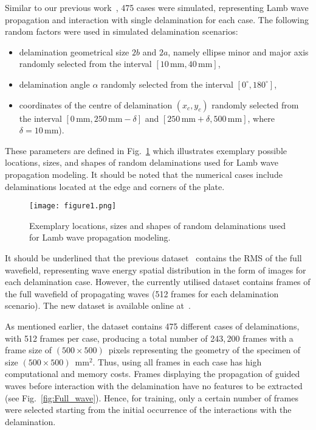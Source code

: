 \begin{sloppypar}
	Similar to our previous work~\cite{Ijjeh2021, Ijjeh2022}, 475 cases were simulated, representing Lamb wave propagation and interaction with single delamination for each case. 
	The following random factors were used in simulated delamination scenarios:
	\begin{itemize}
		\item delamination geometrical size	\(2b\) and \(2a\), namely ellipse minor and major axis randomly selected from the interval \(\left[10 \, \textrm{mm}, 40\, \textrm{mm}\right]\),
		\item delamination angle \(\alpha\) randomly selected from the interval \( \left[ 0^{\circ}, 180^{\circ} \right]\),
		\item coordinates of the centre of delamination \((x_c,y_c)\) randomly selected from the interval \(\left[0\, \textrm{mm}, 250\, \textrm{mm} -\delta \right]\) and \( \left[250\, \textrm{mm}+\delta, 500\, \textrm{mm} \right] \), where \(\delta = 10\, \textrm{mm}\)).
	\end{itemize}
	These parameters are defined in Fig.~\ref{fig:random_delaminations} which illustrates exemplary possible locations, sizes, and shapes of random delaminations used for Lamb wave propagation modeling.
	It should be noted that the numerical cases include delaminations located at the edge and corners of the plate.
	\begin{figure}[!ht]
		\centering
		\texttt{[image: figure1.png]}
		\caption{Exemplary locations, sizes and shapes of random delaminations used for Lamb wave propagation modeling.}
		\label{fig:random_delaminations}
	\end{figure}
	
	It should be underlined that the previous dataset~\cite{Kudela2020d} contains the RMS of the full wavefield, representing wave energy spatial distribution in the form of images for each delamination case.
	However, the currently utilised dataset contains frames of the full wavefield of propagating waves (512 frames for each delamination scenario).
	The new dataset is available online at~\cite{kudela_pawel_2021_5414555}.
	
	As mentioned earlier, the dataset contains 475 different cases of delaminations, with 512 frames per case, producing a total number of 243,\,200 frames with a frame size of \((500\times500)\)~pixels representing the geometry of the specimen of size \((500\times500)\)~mm\(^{2}\).
	Thus, using all frames in each case has high computational and memory costs.
	Frames displaying the propagation of guided waves before interaction with the delamination have no features to be extracted (see Fig.~\ref{fig:Full_wave}).
	Hence, for training, only a certain number of frames were selected starting from the initial occurrence of the interactions with the delamination.
	

\end{sloppypar}
